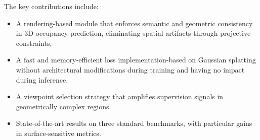 The key contributions include:
\begin{itemize}
    \item {A rendering-based {module} that enforces semantic and geometric consistency in 3D occupancy prediction, eliminating spatial artifacts through projective constraints,}
    \item {A fast and memory-efficient loss implementation-based on Gaussian splatting} without architectural modifications during training and having no impact during inference,
    \item {A viewpoint selection strategy} that amplifies supervision signals in geometrically complex regions.
    \item State-of-the-art results on three standard benchmarks, with particular gains in surface-sensitive metrics.
\end{itemize}





